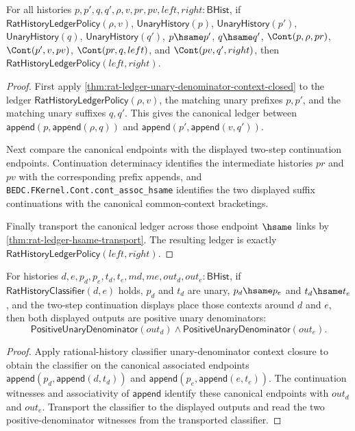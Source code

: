\begin{theorem}
\label{thm:field-rat-denominator-continuation-common-context-ledger-closure}
For all histories $p,p',q,q',\rho,v,pr,pv,left,right:\mathsf{BHist}$, if
$\mathsf{RatHistoryLedgerPolicy}(\rho,v)$, $\mathsf{UnaryHistory}(p)$,
$\mathsf{UnaryHistory}(p')$, $\mathsf{UnaryHistory}(q)$,
$\mathsf{UnaryHistory}(q')$, $p\hsame p'$, $q\hsame q'$,
$\Cont(p,\rho,pr)$, $\Cont(p',v,pv)$, $\Cont(pr,q,left)$, and
$\Cont(pv,q',right)$, then $\mathsf{RatHistoryLedgerPolicy}(left,right)$.
\end{theorem}
\begin{proof}
First apply \autoref{thm:rat-ledger-unary-denominator-context-closed} to the
ledger $\mathsf{RatHistoryLedgerPolicy}(\rho,v)$, the matching unary prefixes
$p,p'$, and the matching unary suffixes $q,q'$. This gives the canonical ledger
between $\mathsf{append}(p,\mathsf{append}(\rho,q))$ and
$\mathsf{append}(p',\mathsf{append}(v,q'))$.

Next compare the canonical endpoints with the displayed two-step continuation
endpoints. Continuation determinacy identifies the intermediate histories
$pr$ and $pv$ with the corresponding prefix appends, and
\texttt{BEDC.FKernel.Cont.cont\_assoc\_hsame} identifies the two displayed
suffix continuations with the canonical common-context bracketings.

Finally transport the canonical ledger across those endpoint $\hsame$ links by
\autoref{thm:rat-ledger-hsame-transport}. The resulting ledger is exactly
$\mathsf{RatHistoryLedgerPolicy}(left,right)$.
\end{proof}

\begin{theorem}
\label{thm:rat-history-classifier-cont-unary-context-positive-denominators}
For histories $d,e,p_d,p_e,t_d,t_e,md,me,out_d,out_e:\mathsf{BHist}$, if
$\mathsf{RatHistoryClassifier}(d,e)$ holds, $p_d$ and $t_d$ are unary,
$p_d\hsame p_e$ and $t_d\hsame t_e$, and the two-step continuation displays
place those contexts around $d$ and $e$, then both displayed outputs are
positive unary denominators:
$$
\mathsf{PositiveUnaryDenominator}(out_d)\land
\mathsf{PositiveUnaryDenominator}(out_e).
$$
\end{theorem}
\begin{proof}
Apply rational-history classifier unary-denominator context closure to obtain
the classifier on the canonical associated endpoints
$\mathsf{append}(p_d,\mathsf{append}(d,t_d))$ and
$\mathsf{append}(p_e,\mathsf{append}(e,t_e))$. The continuation witnesses and
associativity of $\mathsf{append}$ identify these canonical endpoints with
$out_d$ and $out_e$. Transport the classifier to the displayed outputs and
read the two positive-denominator witnesses from the transported classifier.
\end{proof}

